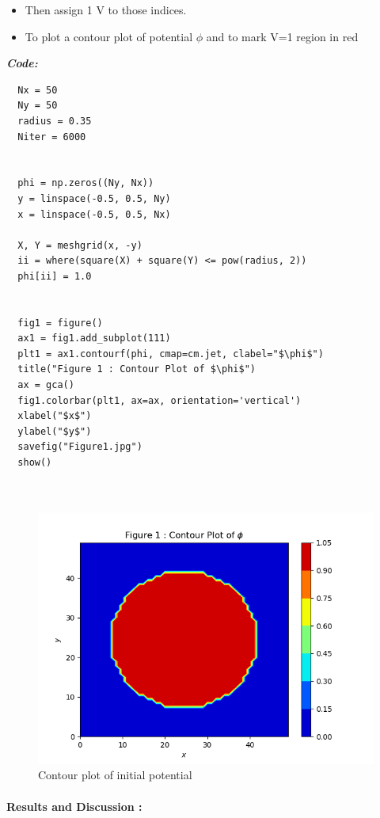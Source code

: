 \documentclass[11pt, a4paper]{article}
\begin{document}
\begin{itemize}
\item
  Then assign 1 V to those indices.
\item
  To plot a contour plot of potential \(\phi\) and to mark V=1 region in
  red

\end{itemize}
\newpage
\textit{\textbf{Code:}}
\begin{lstlisting}
  Nx = 50  
  Ny = 50
  radius = 0.35
  Niter = 6000
  
  
  phi = np.zeros((Ny, Nx))
  y = linspace(-0.5, 0.5, Ny)
  x = linspace(-0.5, 0.5, Nx)

  X, Y = meshgrid(x, -y)           
  ii = where(square(X) + square(Y) <= pow(radius, 2))
  phi[ii] = 1.0 
  
  
  fig1 = figure()
  ax1 = fig1.add_subplot(111)
  plt1 = ax1.contourf(phi, cmap=cm.jet, clabel="$\phi$")
  title("Figure 1 : Contour Plot of $\phi$")
  ax = gca()
  fig1.colorbar(plt1, ax=ax, orientation='vertical')
  xlabel("$x$")
  ylabel("$y$")
  savefig("Figure1.jpg")
  show()
  
  
       \end{lstlisting}
       \newpage
	     \begin{figure}[!tbh]
        \centering
        \includegraphics[scale=0.8]{./../Extras/Figure_1.png}  
        \caption{Contour plot of initial potential}
   \end{figure}
   \paragraph{Results and Discussion :}\label{results-and-discussion}
\end{document}
